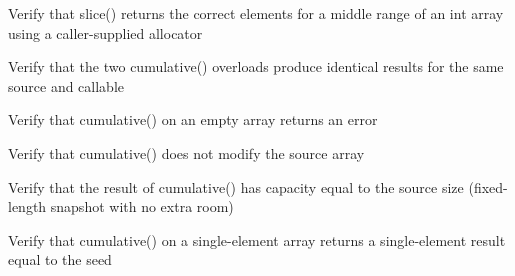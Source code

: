 \begin{DoxyRefList}
%
Verify that slice() returns the correct elements for a middle range of an int array using a caller-\/supplied allocator  
\item[Global \doxylink{test__array_8cpp_a6629ae3de91bd8441c66dfaf2b89decc}{TEST\+\_\+F} (\doxylink{classArrayInitTest}{Array\+Init\+Test}, Cumulative\+Both\+Overloads\+Produce\+Same\+Result)]\label{test__test000100}%
%
Verify that the two cumulative() overloads produce identical results for the same source and callable  
\item[Global \doxylink{test__array_8cpp_add03ec89bdf7d3b39ffb5ea224e19132}{TEST\+\_\+F} (\doxylink{classArrayInitTest}{Array\+Init\+Test}, Cumulative\+Empty\+Array\+Returns\+Error)]\label{test__test000099}%
%
Verify that cumulative() on an empty array returns an error  
\item[Global \doxylink{test__array_8cpp_af508fc9a81bef8e86c5c4f3f0fe312b1}{TEST\+\_\+F} (\doxylink{classArrayInitTest}{Array\+Init\+Test}, Cumulative\+Does\+Not\+Modify\+Source)]\label{test__test000098}%
%
Verify that cumulative() does not modify the source array  
\item[Global \doxylink{test__array_8cpp_a096a336178b7aea67c03522c8ebae7ad}{TEST\+\_\+F} (\doxylink{classArrayInitTest}{Array\+Init\+Test}, Cumulative\+Result\+Capacity\+Equals\+Source\+Size)]\label{test__test000097}%
%
Verify that the result of cumulative() has capacity equal to the source size (fixed-\/length snapshot with no extra room)  
\item[Global \doxylink{test__array_8cpp_a30c50d579494b45ed1f2794a36f27543}{TEST\+\_\+F} (\doxylink{classArrayInitTest}{Array\+Init\+Test}, Cumulative\+Single\+Element\+Returns\+Seed)]\label{test__test000096}%
%
Verify that cumulative() on a single-\/element array returns a single-\/element result equal to the seed 
\end{DoxyRefList}